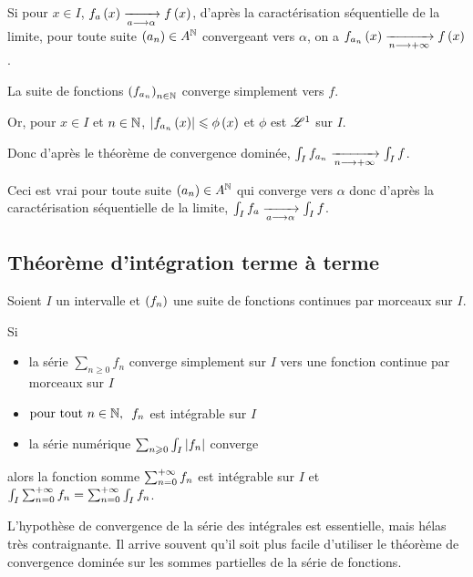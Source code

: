 \begin{dem}
Si pour \(x\in I\), \(f_a\left(x\right)\xrightarrow[a\longrightarrow\alpha]{}f\left(x\right)\), d'après la caractérisation séquentielle de la limite, pour toute suite \(\left(a_n\right)\in A^{\mathbb{N}}\) convergeant vers \(\alpha\), on a \(f_{a_n}\left(x\right)\xrightarrow[n\longrightarrow+\infty]{}f\left(x\right)\).

La suite de fonctions \(\left(f_{a_n}\right)_{n\in\mathbb{N}}\) converge simplement vers \(f\).

Or, pour \(x\in I\) et \(n\in\mathbb{N}\), \(\left\lvert f_{a_n}\left(x\right)\right\rvert\leqslant\phi\left(x\right)\) et \(\phi\) est \(\integ{1}{}{}\) sur \(I\).

Donc d'après le théorème de convergence dominée, \(\int_If_{a_n}\xrightarrow[n\longrightarrow+\infty]{}\int_If\).

Ceci est vrai pour toute suite \(\left(a_n\right)\in A^{\mathbb{N}}\) qui converge vers \(\alpha\) donc d'après la caractérisation séquentielle de la limite, \(\int_If_a\xrightarrow[a\longrightarrow\alpha]{}\int_If\).
\end{dem}

\subsection{Théorème d'intégration terme à terme}

\begin{theo}
Soient \(I\) un intervalle et \(\left(f_n\right)\) une suite de fonctions continues par morceaux sur \(I\).

Si

\begin{itemize}
    \item la série \(\sum_{n\geq0}f_n\) converge simplement sur \(I\) vers une fonction continue par morceaux sur \(I\) \\
    \item \(\quantifs{\tpt n\in\N}f_n\) est intégrable sur \(I\) \\
    \item la série numérique \(\sum_{n\geqslant0}\int_I\left\lvert f_n\right\rvert\) converge
\end{itemize}

alors la fonction somme \(\sum_{n=0}^{+\infty}f_n\) est intégrable sur \(I\) et \(\int_I\sum_{n=0}^{+\infty}f_n=\sum_{n=0}^{+\infty}\int_If_n\).
\end{theo}

L'hypothèse de convergence de la série des intégrales est essentielle, mais hélas très contraignante. Il arrive souvent qu'il soit plus facile d'utiliser le théorème de convergence dominée sur les sommes partielles de la série de fonctions.

